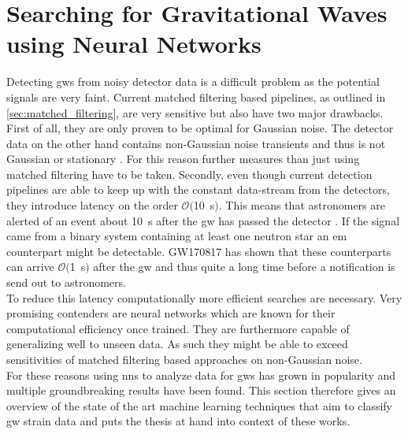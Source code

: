 \section{Searching for Gravitational Waves using Neural Networks}\label{sec:related_works}
Detecting \gls{gw}s from noisy detector data is a difficult problem as the potential signals are very faint. Current matched filtering based pipelines, as outlined in \autoref{sec:matched_filtering}, are very sensitive but also have two major drawbacks. First of all, they are only proven to be optimal for Gaussian noise. The detector data on the other hand contains non-Gaussian noise transients and thus is not Gaussian or stationary \cite{glitches_gw150914}. For this reason further measures than just using matched filtering have to be taken. Secondly, even though current detection pipelines are able to keep up with the constant data-stream from the detectors, they introduce latency on the order $\mathcal{O}($\SI{10}{\s}$)$. This means that astronomers are alerted of an event about \SI{10}{\s} after the \gls{gw} has passed the detector \cite{pycbc_live}. If the signal came from a binary system containing at least one neutron star an \gls{em} counterpart might be detectable. GW170817 has shown that these counterparts can arrive $\mathcal{O}($\SI{1}{\s}$)$ after the \gls{gw} and thus quite a long time before a notification is send out to astronomers.\\
To reduce this latency computationally more efficient searches are necessary. Very promising contenders are neural networks which are known for their computational efficiency once trained. They are furthermore capable of generalizing well to unseen data. As such they might be able to exceed sensitivities of matched filtering based approaches on non-Gaussian noise.\\
For these reasons using \gls{nn}s to analyze data for \gls{gw}s has grown in popularity and multiple groundbreaking results have been found. This section therefore gives an overview of the state of the art machine learning techniques that aim to classify \gls{gw} strain data and puts the thesis at hand into context of these works.\\
